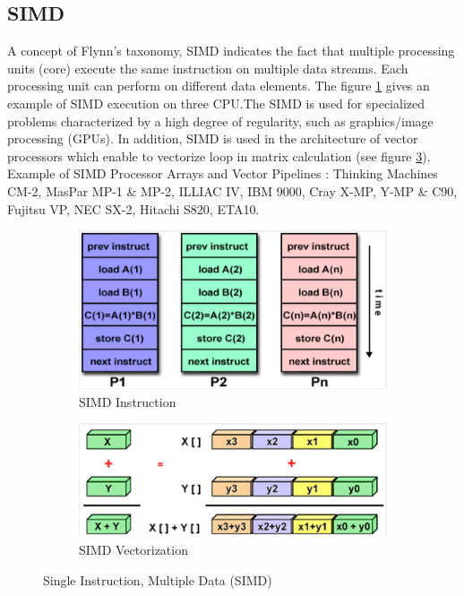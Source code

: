 \subsection{SIMD} \label{simb} A concept of Flynn's taxonomy, SIMD indicates the fact that multiple processing units (core) execute the same instruction on multiple data streams. Each processing unit can perform on different data elements. The figure \ref{simb} gives an example of SIMD execution on three CPU.The SIMD is used for specialized problems characterized by a high degree of regularity, such as graphics/image processing (GPUs). In addition, SIMD is used in the architecture of vector processors which enable to vectorize loop in matrix calculation (see figure \ref{vector}).  
Example of SIMD Processor Arrays and Vector Pipelines : Thinking Machines CM-2, MasPar MP-1 \& MP-2, ILLIAC IV, IBM 9000, Cray X-MP, Y-MP \& C90, Fujitsu VP, NEC SX-2, Hitachi S820, ETA10.
\begin{figure}[!h]
\centering 
  \begin{subfigure}[b]{0.4\textwidth}
    \includegraphics[width=\textwidth]{images/simd.png}
    \caption{SIMD Instruction}
    \label{simb}
  \end{subfigure}
  \begin{subfigure}[b]{0.4\textwidth}
    \includegraphics[width=\textwidth]{images/vectorization.png}
    \caption{SIMD Vectorization}
    \label{vector}
  \end{subfigure}
  \caption{Single Instruction, Multiple Data (SIMD)}
\end{figure}

